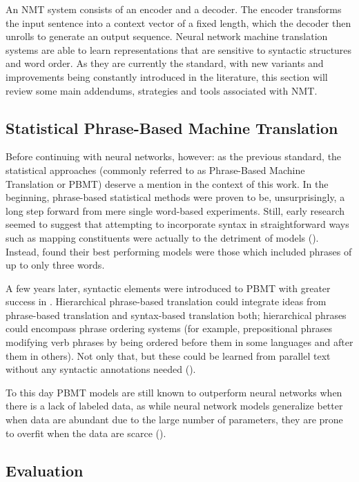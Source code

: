 An NMT system consists of an encoder and a decoder. The encoder transforms the input sentence into a context vector of a fixed length, which the decoder then unrolls to generate an output sequence. Neural network machine translation systems are able to learn representations that are sensitive to syntactic structures and word order. As they are currently the standard, with new variants and improvements being constantly introduced in the literature, this section will review some main addendums, strategies and tools associated with NMT.

\subsection{Statistical Phrase-Based Machine Translation}

Before continuing with neural networks, however: as the previous standard, the statistical approaches (commonly referred to as Phrase-Based Machine Translation or PBMT) deserve a mention in the context of this work. In the beginning, phrase-based statistical methods were proven to be, unsurprisingly, a long step forward from mere single word-based experiments. Still, early research seemed to suggest that attempting to incorporate syntax in straightforward ways such as mapping constituents were actually to the detriment of models (\cite{koehn2003statistical}). Instead, \cite{koehn2003statistical} found their best performing models were those which included phrases of up to only three words.

A few years later, syntactic elements were introduced to PBMT with greater success in \cite{chiang2007hierarchical}. Hierarchical phrase-based translation could integrate ideas from phrase-based translation and syntax-based translation both; hierarchical phrases could encompass phrase ordering systems (for example, prepositional phrases modifying verb phrases by being ordered before them in some languages and after them in others). Not only that, but these could be learned from parallel text without any syntactic annotations needed (\cite{chiang2007hierarchical}).

To this day PBMT models are still known to outperform neural networks when there is a lack of labeled data, as while neural network models generalize better when data are abundant due to the large number of parameters, they are prone to overfit when the data are scarce (\cite{lample2018unsupervised}).

\subsection{Evaluation}

